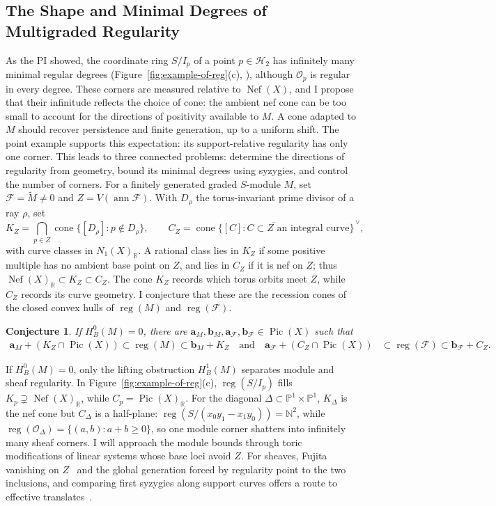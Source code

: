\documentclass[11pt,reqno]{amsart}
\newtheorem{conjecture}[lemma]{Conjecture}
\theoremstyle{remark}
\newcommand{\reg}{\operatorname{reg}}
\newcommand{\ann}{\operatorname{ann}}
\newcommand{\Pic}{\operatorname{Pic}}
\newcommand{\Nef}{\operatorname{Nef}}
\newcommand{\cone}{\operatorname{cone}}
\renewcommand{\aa}{\mathbf{a}}
\newcommand{\bb}{\mathbf{b}}
\newcommand{\NN}{\mathbb{N}}
\newcommand{\PP}{\mathbb{P}}
\newcommand{\RR}{\mathbb{R}}
\newcommand{\cF}{\mathcal{F}}
\newcommand{\cH}{\mathcal{H}}
\newcommand{\cO}{\mathcal{O}}
\begin{document}
\subsection{The Shape and Minimal Degrees of Multigraded Regularity}\label{subsec:shape-of-regularity}
As the PI showed, the coordinate ring $S/I_p$ of a point $p\in\cH_2$ has infinitely many minimal regular degrees (Figure~\ref{fig:example-of-reg}(c), \cite{bruceHellerSayrafi22}), although $\cO_p$ is regular in every degree. These corners are measured relative to $\Nef(X)$, and I propose that their infinitude reflects the choice of cone: the ambient nef cone can be too small to account for the directions of positivity available to $M$. A cone adapted to $M$ should recover persistence and finite generation, up to a uniform shift. The point example supports this expectation: its support-relative regularity has only one corner. This leads to three connected problems: determine the directions of regularity from geometry, bound its minimal degrees using syzygies, and control the number of corners. For a finitely generated graded $S$-module $M$, set $\cF=\widetilde M\ne0$ and $Z=V(\ann\cF)$. With $D_\rho$ the torus-invariant prime divisor of a ray $\rho$, set
\[
K_Z=\bigcap_{p\in Z}\cone\{[D_\rho]:p\notin D_\rho\},
\qquad
C_Z=\overline{\cone\{[C]:C\subset Z\text{ an integral curve}\}}^{\,\vee},
\]
with curve classes in $N_1(X)_{\RR}$. A rational class lies in $K_Z$ if some positive multiple has no ambient base point on $Z$, and lies in $C_Z$ if it is nef on $Z$; thus $\Nef(X)_{\RR}\subset K_Z\subset C_Z$. The cone $K_Z$ records which torus orbits meet $Z$, while $C_Z$ records its curve geometry. I conjecture that these are the recession cones of the closed convex hulls of $\reg(M)$ and $\reg(\cF)$.

\begin{conjecture}\label{conj:support-cone-duality}
If $H_B^0(M)=0$, there are $\aa_M,\bb_M,\aa_{\cF},\bb_{\cF}\in\Pic(X)$ such that
\[
\begin{aligned}
\aa_M+(K_Z\cap\Pic(X))\subset\reg(M)\subset\bb_M+K_Z \quad \text{and} \quad
\aa_{\cF}+(C_Z\cap\Pic(X))&\subset\reg(\cF)\subset\bb_{\cF}+C_Z.
\end{aligned}
\]
\end{conjecture}

If $H_B^0(M)=0$, only the lifting obstruction $H_B^1(M)$ separates module and sheaf regularity. In Figure~\ref{fig:example-of-reg}(c), $\reg(S/I_p)$ fills $K_p\supsetneq\Nef(X)_{\RR}$, while $C_p=\Pic(X)_{\RR}$. For the diagonal $\Delta\subset\PP^1\times\PP^1$, $K_\Delta$ is the nef cone but $C_\Delta$ is a half-plane: $\reg(S/(x_0y_1-x_1y_0))=\NN^2$, while $\reg(\cO_\Delta)=\{(a,b):a+b\ge0\}$, so one module corner shatters into infinitely many sheaf corners. I will approach the module bounds through toric modifications of linear systems whose base loci avoid $Z$. For sheaves, Fujita vanishing on $Z$~\cite[Thm.~1.5]{keeler03} and the global generation forced by regularity point to the two inclusions, and comparing first syzygies along support curves offers a route to effective translates~\cite{maclaganSmith04}.
\end{document}
